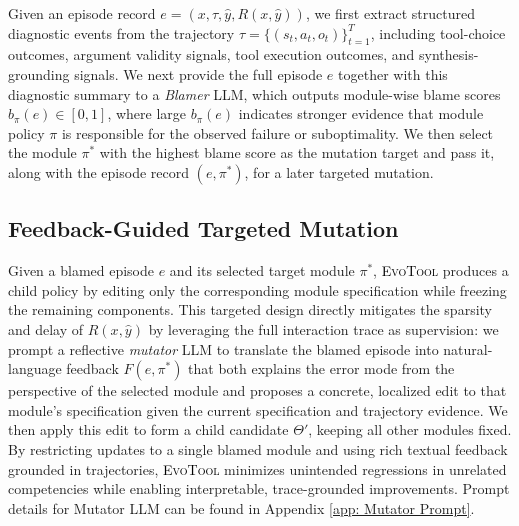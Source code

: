 \documentclass[11pt]{article}
\begin{document}



Given an episode record $e=(x,\tau,\hat{y},R(x,\hat{y}))$, we first extract structured diagnostic events from the trajectory $\tau=\{(s_t,a_t,o_t)\}_{t=1}^{T}$, including tool-choice outcomes, argument validity signals, tool execution outcomes, and synthesis-grounding signals. We next provide the full episode $e$ together with this diagnostic summary to a \textit{Blamer} LLM, which outputs module-wise blame scores $b_{\pi}(e) \in [0,1]$, 
 where large $b_{\pi}(e)$ indicates stronger evidence that module policy $\pi$ is responsible for the observed failure or suboptimality. We then select the module $\pi^{\ast}$ with the highest blame score as the mutation target and pass it, along with the episode record $(e,\pi^{\ast})$, for a later targeted mutation. 







\subsection{Feedback-Guided Targeted Mutation}
\label{sec: targed mutation}

Given a blamed episode $e$ and its selected target module $\pi^{\ast}$, \textcolor{black}{\textsc{EvoTool}} produces a child policy by editing only the corresponding module specification while freezing the remaining components. 
This targeted design directly mitigates the sparsity and delay of $R(x,\hat{y})$ by leveraging the full interaction trace as supervision: we prompt a reflective \textit{mutator} LLM to translate the blamed episode into natural-language feedback $F(e,\pi^{\ast})$ that both explains the error mode from the perspective of the selected module and proposes a concrete, localized edit to that module's specification given the current specification and trajectory evidence. We then apply this edit to form a child candidate $\Theta'$, keeping all other modules fixed.
By restricting updates to a single blamed module and using rich textual feedback grounded in trajectories, \textcolor{black}{\textsc{EvoTool}} minimizes unintended regressions in unrelated competencies while enabling interpretable, trace-grounded improvements. Prompt details for Mutator LLM can be found in Appendix \ref{app: Mutator Prompt}.
\end{document}
